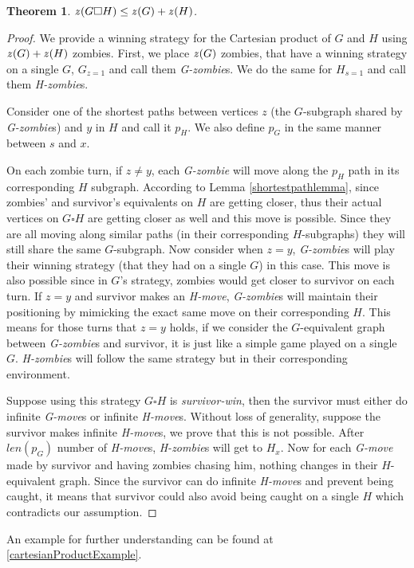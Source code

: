 \documentclass[1p]{elsarticle}
\newtheorem{theorem}{Theorem}
\newcommand{\zn}{\ooalign{$z$\cr\hfil\rule[.5ex]{.2em}{.08ex}\hfil\cr}}
\begin{document}
\begin{theorem}
	$\zn(G \square H) \leq \zn(G) + \zn(H)$.
\end{theorem}

\begin{proof}
	We provide a winning strategy for the Cartesian product of $G$ and $H$ using $\zn(G)+\zn(H)$ zombies. First, we place
	$\zn(G)$ zombies, that have a winning strategy on a single $G$, $G_{z = 1}$ and call them {\it G-zombie}s. We do the
	same for $H_{s = 1}$ and call them {\it H-zombie}s.


	Consider one of the shortest paths between vertices $z$ (the $G$-subgraph shared by {\it G-zombie}s) and $y$ in $H$
	and call it $p_H$. We also define $p_G$ in the same manner between $s$ and $x$.


	On each zombie turn, if $z \neq y$, each {\it G-zombie} will move along the $p_H$ path in its corresponding $H$
	subgraph. According to Lemma \ref{shortestpathlemma}, since zombies' and survivor's equivalents on $H$ are getting
	closer, thus their actual vertices on $G \square H$ are getting closer as well and this move is possible. Since they
	are all moving along similar paths (in their corresponding $H$-subgraphs) they will still share the same
	$G$-subgraph. Now consider when $z = y$, {\it G-zombie}s will play their winning strategy (that they had on a single
	$G$) in this case. This move is also possible since in $G$'s strategy, zombies would get closer to survivor on each
	turn. If $z = y$ and survivor makes an {\it H-move}, {\it G-zombie}s will maintain their positioning by mimicking
	the exact same move on their corresponding $H$. This means for those turns that $z=y$ holds, if we consider the
	$G$-equivalent graph between {\it G-zombie}s and survivor, it is just like a simple game played on a single $G$.
	{\it H-zombie}s will follow the same strategy but in their corresponding environment.
	
	
	Suppose using this strategy $G \square H$ is {\it survivor-win}, then the survivor must either do infinite {\it
	G-move}s or infinite {\it H-move}s. Without loss of generality, suppose the survivor makes infinite {\it H-move}s,
	we prove that this is not possible. After $len(p_G)$ number of {\it H-move}s, {\it H-zombie}s will get to $H_x$. Now for
	each {\it G-move} made by survivor and having zombies chasing him, nothing changes in their $H$-equivalent graph.
	Since the survivor can do infinite {\it H-move}s and prevent being caught, it means that survivor could also avoid
	being caught on a single $H$ which contradicts our assumption.
	
\end{proof}
An example for further understanding can be found at \ref{cartesianProductExample}.
\end{document}

